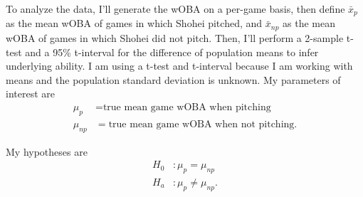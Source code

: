 \documentclass[12pt]{article}
\begin{document}
To analyze the data, I'll generate the wOBA on a per-game basis, then define \(\bar{x}_p\) as the mean wOBA of games in which Shohei pitched, and \(\bar{x}_{np}\) as the mean wOBA of games in which Shohei did not pitch. Then, I’ll perform a 2-sample t-test and a 95\% t-interval for the difference of population means to infer underlying ability. I am using a t-test and t-interval because I am working with means and the population standard deviation is unknown. My parameters of interest are
\begin{align*}
    \mu_p    & = \text{true mean game wOBA when pitching}      \\
    \mu_{np} & = \text{true mean game wOBA when not pitching}.
\end{align*}

My hypotheses are
\begin{align*}
    H_0 & : \mu_p = \mu_{np}     \\
    H_a & : \mu_p \neq \mu_{np}.
\end{align*}
\end{document}

